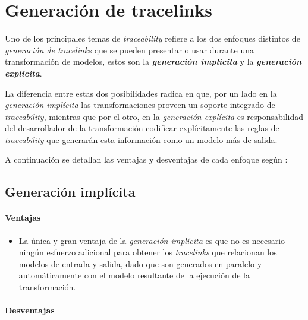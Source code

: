 \documentclass[a4paper,12pt,oneside,spanish]{book}
\begin{document}
\section{Generación de tracelinks}
\label{sec:GeneracionTracelinks}

Uno de los principales temas de \textit{traceability} refiere a los dos enfoques distintos de \textit{generación de tracelinks} que se pueden presentar o usar durante una transformación de modelos, estos son la \textit{\textbf{generación implícita}} y la \textit{\textbf{generación explícita}}. 

La diferencia entre estas dos posibilidades radica en que, por un lado en la \textit{generación implícita} las transformaciones proveen un soporte integrado de \textit{traceability}, mientras que por el otro, en la \textit{generación explícita} es responsabilidad del desarrollador de la transformación codificar explícitamente las reglas de \textit{traceability} que generarán esta información como un modelo más de salida.

A continuación se detallan las ventajas y desventajas de cada enfoque según \cite{GrammelVoigt}:


\subsection{Generación implícita}

\paragraph{Ventajas}

\begin{itemize}[label={\checkmark}]

\item La única y gran ventaja de la \textit{generación implícita} es que no es necesario ningún esfuerzo adicional para obtener los \textit{tracelinks} que relacionan los modelos de entrada y salida, dado que son generados en paralelo y automáticamente con el modelo resultante de la ejecución de la transformación.

\end{itemize}

\paragraph{Desventajas}
\end{document}
